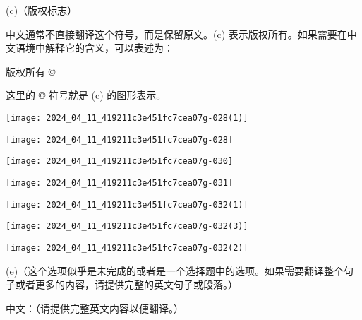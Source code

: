 (c)（版权标志）

中文通常不直接翻译这个符号，而是保留原文。(c) 表示版权所有。如果需要在中文语境中解释它的含义，可以表述为：

版权所有 ©

这里的 © 符号就是 (c) 的图形表示。

\begin{center}
\texttt{[image: 2024\_04\_11\_419211c3e451fc7cea07g-028(1)]}
\end{center}
\begin{center}
\texttt{[image: 2024\_04\_11\_419211c3e451fc7cea07g-028]}
\end{center}
\begin{center}
\texttt{[image: 2024\_04\_11\_419211c3e451fc7cea07g-030]}
\end{center}
\begin{center}
\texttt{[image: 2024\_04\_11\_419211c3e451fc7cea07g-031]}
\end{center}
\begin{center}
\texttt{[image: 2024\_04\_11\_419211c3e451fc7cea07g-032(1)]}
\end{center}
\begin{center}
\texttt{[image: 2024\_04\_11\_419211c3e451fc7cea07g-032(3)]}
\end{center}
\begin{center}
\texttt{[image: 2024\_04\_11\_419211c3e451fc7cea07g-032(2)]}
\end{center}

(e)（这个选项似乎是未完成的或者是一个选择题中的选项。如果需要翻译整个句子或者更多的内容，请提供完整的英文句子或段落。） 

中文：（请提供完整英文内容以便翻译。）

